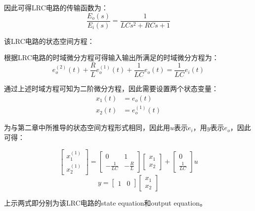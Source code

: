 \documentclass{article}
\numberwithin{equation}{section}
\numberwithin{figure}{section}
\begin{document}
因此可得LRC电路的传输函数为：
\begin{equation}
    \frac{E_o(s)}{E_i(s)}=\frac{1}{LCs^2+RCs+1}
\end{equation}

该LRC电路的状态空间方程：

根据LRC电路的时域微分方程可得输入输出所满足的时域微分方程为：
\begin{equation}
    e^{(2)}_o(t)+\frac{R}{L}e^{(1)}_o(t)+\frac{1}{LC}e_o(t)=\frac{1}{LC}e_i(t)
\end{equation}

通过上述时域方程可知为二阶微分方程，因此需要设置两个状态变量：
\begin{equation}
    \begin{split}
        x_1(t)&=e_o(t)\\
        x_2(t)&=e^{(1)}_o(t)
    \end{split}
\end{equation}

为与第二章中所推导的状态空间方程形式相同，因此用$u$表示$e_i$，用$y$表示$e_o$，因此可得：

\begin{equation}
    \begin{bmatrix}
        x^{(1)}_1\\
        x^{(1)}_2
    \end{bmatrix}
    =
    \begin{bmatrix}
        0&1\\
        -\frac{1}{LC}&-\frac{R}{L}
    \end{bmatrix}
    \begin{bmatrix}
        x_1\\
        x_2
    \end{bmatrix}
    +
    \begin{bmatrix}
        0\\
        \frac{1}{LC}
    \end{bmatrix}
    u
\end{equation}
\begin{equation}
    y=
    \begin{bmatrix}
        1&0
    \end{bmatrix}
    \begin{bmatrix}
        x_1\\
        x_2
    \end{bmatrix}
\end{equation}

上示两式即分别为该LRC电路的state equation和output equation。
\end{document}
